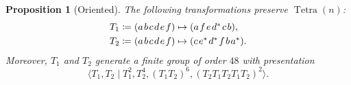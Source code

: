 \documentclass[notitlepage, 11pt, letterpaper]{amsart}
\makeatletter
\theoremstyle{plain}
\newtheorem{prop}[thm]{Proposition}
\theoremstyle{definition}
\DeclareMathOperator{\Tetra}{Tetra}
\newcommand{\ea}{a}
\newcommand{\eb}{b}
\newcommand{\ec}{c}
\newcommand{\ed}{d}
\newcommand{\ee}{e}
\newcommand{\ef}{f}
\newcommand{\tightoctuple}[1]{
\begingroup
\arraycolsep=0.5pt
\renewcommand{\arraystretch}{0.3}
\begin{array}{@{}c@{}cccccc@{}c@{}}#1\end{array}
\endgroup
}
\makeatother
\begin{document}
\begin{prop}[Oriented]
    \label{prop:tet_symmetry}
    The following transformations preserve $\Tetra(n)$:
    \begin{align}
        \label{eq:gens_of_tet_sym}
        \begin{split}
            T_1 \coloneqq \tightoctuple{( & \ea & \eb & \ec & \ed  & \ee  & \ef & )}
            &\mapsto
            \tightoctuple{( & \ea & \ef  & \ee  & \ed^{*}  & \ec  & \eb & )}, \\
            T_2 \coloneqq \tightoctuple{( & \ea & \eb & \ec & \ed  & \ee  & \ef & )}
            &\mapsto
            \tightoctuple{( & \ec  & \ee^*  & \ed^{*}  & \ef  & \eb  & \ea^* & )}.
        \end{split}
    \end{align}
    Moreover, $T_1$ and $T_2$ generate a finite group of order $48$ with presentation
    \begin{equation}
        \langle T_1, T_2 \mid T_1^2, T_2^4, (T_1 T_2)^6, (T_2T_1T_2T_1T_2)^2 \rangle.
    \end{equation}

\end{prop}
\end{document}
